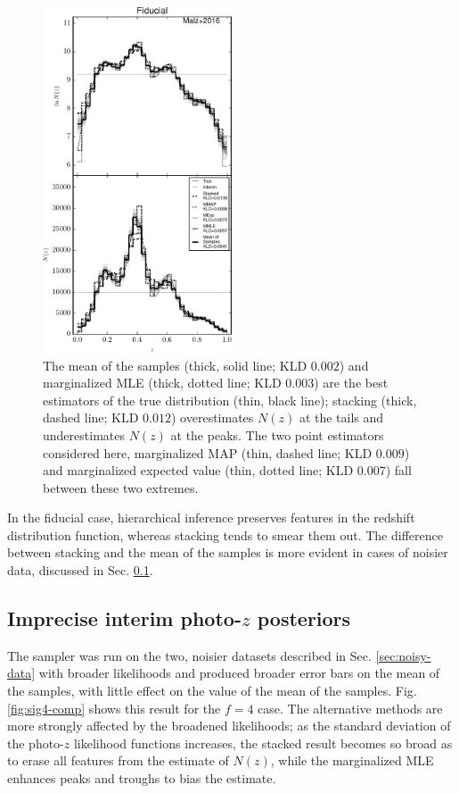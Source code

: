 \documentclass[preprint]{aastex}
\begin{document}
\begin{figure}
\includegraphics[width=0.5\textwidth]{figs/null/comps.pdf}
\caption{The mean of the samples (thick, solid line; KLD $0.002$) and 
marginalized MLE (thick, dotted line; KLD $0.003$) are the best estimators of 
the true distribution (thin, black line); stacking (thick, dashed line; KLD 
$0.012$) overestimates $N(z)$ at the tails and underestimates $N(z)$ at the 
peaks.  The two point estimators considered here, marginalized MAP (thin, 
dashed line; KLD $0.009$) and marginalized expected value (thin, dotted line; 
KLD $0.007$) fall between these two extremes.}
\label{fig:null-comp}
\end{figure}

In the fiducial case, hierarchical inference preserves features in the redshift 
distribution function, whereas stacking tends to smear them out.  The 
difference between stacking and the mean of the samples is more evident in 
cases of noisier data, discussed in Sec. \ref{sec:noisy}.

\subsection{Imprecise interim photo-$z$ posteriors}
\label{sec:noisy}

The sampler was run on the two, noisier datasets described in Sec. 
\ref{sec:noisy-data} with broader likelihoods and produced broader error bars 
on the mean of the samples, with little effect on the value of the mean of the 
samples.  Fig. \ref{fig:sig4-comp} shows this result for the $f=4$ case.  The 
alternative methods are more strongly affected by the broadened likelihoods; as 
the standard deviation of the photo-$z$ likelihood functions increases, the 
stacked result becomes so broad as to erase all features from the estimate of 
$N(z)$, while the marginalized MLE enhances peaks and troughs to bias the 
estimate.
\end{document}
